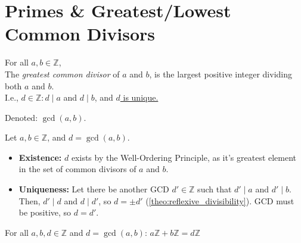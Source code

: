 \newpage
\section{Primes \& Greatest/Lowest Common Divisors}

\begin{Def}

    \label{def:gcd}

    For all $a,b\in\mathbb{Z}$,\\
    The \textit{greatest common divisor} of $a$ and $b$, is the largest positive integer dividing both $a$ and $b$.\\
    I.e., $d\in\mathbb{Z}: d\mid a$ and $d\mid b$, and \underline{$d$ is unique.}

    \noindent
    Denoted: $\gcd(a,b)$.
\end{Def}

\begin{Proof}

    \label{theo:gcd_existence_uniqueness}

    Let $a,b\in\mathbb{Z}$, and $d=\gcd(a,b)$.\\
    \begin{itemize}
        \item  \textbf{Existence:} $d$ exists by the Well-Ordering Principle, 
        as it's greatest element in the set of common divisors of $a$ and $b$.
        \item \textbf{Uniqueness:} Let there be another GCD $d'\in\mathbb{Z}$ such that $d'\mid a$ and $d'\mid b$.\\
        Then, $d'\mid d$ and $d\mid d'$, so $d=\pm d'$ (\ref{theo:reflexive_divisibility}). GCD must be positive, so $d=d'$.
    \end{itemize}

   

\end{Proof}

\begin{theo}

    \label{theo:gcd_ideal_linear_combination}

    For all \(a, b,d \in \mathbb{Z}\) and $d=\gcd(a,b)$: \(a\mathbb{Z} + b\mathbb{Z} = d\mathbb{Z}\)

\end{theo}

